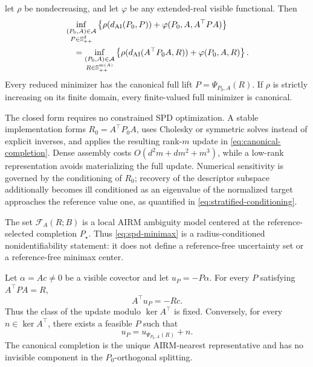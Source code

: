 \begin{theorem}
\begin{enumerate}[label=(\Alph*),leftmargin=*]
  let \(\rho\) be nondecreasing, and let \(\varphi\) be any extended-real
  visible functional.  Then
  \begin{align}
    &\inf_{\substack{(P_0,A)\in\mathcal A\\P\in\mathbb S_{++}^d}}
    \left\{\rho(d_{\mathrm{AI}}(P_0,P))+\varphi(P_0,A,A^\top PA)\right\}
    \nonumber\\
    &\quad=
    \inf_{\substack{(P_0,A)\in\mathcal A\\R\in\mathbb S_{++}^{m(A)}}}
    \left\{\rho(d_{\mathrm{AI}}(A^\top P_0A,R))+\varphi(P_0,A,R)\right\}.
    \label{eq:spd-decision-reduction}
  \end{align}
  Every reduced minimizer has the canonical full lift
  \(P=\Psi_{P_0,A}(R)\).  If \(\rho\) is strictly increasing on its finite
  domain, every finite-valued full minimizer is canonical.
\end{enumerate}
\end{theorem}

The closed form requires no constrained SPD optimization.  A stable
implementation forms \(R_0=A^\top P_0A\), uses Cholesky or symmetric solves
instead of explicit inverses, and applies the resulting rank-\(m\) update in
\eqref{eq:canonical-completion}.  Dense assembly costs
\(O(d^2m+dm^2+m^3)\), while a low-rank representation avoids materializing
the full update.  Numerical sensitivity is governed by the conditioning of
\(R_0\); recovery of the descriptor subspace additionally becomes ill
conditioned as an eigenvalue of the normalized target approaches the
reference value one, as quantified in \eqref{eq:stratified-conditioning}.

The set \(\mathcal F_A(R;B)\) is a local AIRM ambiguity model centered at
the reference-selected completion \(P_\star\).  Thus
\eqref{eq:spd-minimax} is a radius-conditioned nonidentifiability statement:
it does not define a reference-free uncertainty set or a reference-free
minimax center.

\begin{corollary}
\label{cor:visible-update}
Let \(\alpha=Ac\ne0\) be a visible covector and let
\(u_P=-P\alpha\).  For every \(P\) satisfying \(A^\top PA=R\),
\begin{equation}
  A^\top u_P=-Rc.
  \label{eq:visible-update-quotient}
\end{equation}
Thus the class of the update modulo \(\ker A^\top\) is fixed.  Conversely,
for every \(n\in\ker A^\top\), there exists a feasible \(P\) such that
\begin{equation}
  u_P=u_{\Psi_{P_0,A}(R)}+n.
  \label{eq:arbitrary-invisible-drift}
\end{equation}
The canonical completion is the unique AIRM-nearest representative and has no
invisible component in the \(P_0\)-orthogonal splitting.
\end{corollary}

